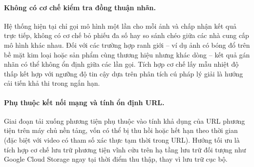 \paragraph{Không có cơ chế kiểm tra đồng thuận nhãn.}
Hệ thống hiện tại chỉ gọi mô hình một lần cho mỗi ảnh và chấp nhận kết quả trực
tiếp, không có cơ chế bỏ phiếu đa số hay so sánh chéo
giữa các nhà cung cấp mô hình khác nhau. Đối với các trường hợp ranh giới
-- ví dụ ảnh có bóng đổ trên bề mặt kim loại hoặc sản phẩm
cùng thương hiệu nhưng khác dòng -- kết quả gán nhãn có thể không ổn định giữa các
lần gọi. Tích hợp cơ chế lấy mẫu nhiệt độ thấp
kết hợp với ngưỡng độ tin cậy dựa trên phân tích cú
pháp lý giải là hướng cải tiến khả thi trong ngắn hạn.

\paragraph{Phụ thuộc kết nối mạng và tính ổn định URL.}
Giai đoạn tải xuống phương tiện phụ thuộc vào tính khả dụng của URL phương tiện
trên máy chủ nền tảng, vốn có thể bị thu hồi hoặc hết hạn theo thời gian (đặc biệt
với video có tham số xác thực tạm thời trong URL). Hướng tối ưu là tích hợp cơ chế
lưu trữ phương tiện vĩnh cửu trên hạ tầng lưu trữ đối tượng 
như Google Cloud Storage ngay tại thời điểm thu thập, thay vì lưu trữ cục bộ.
\clearpage
